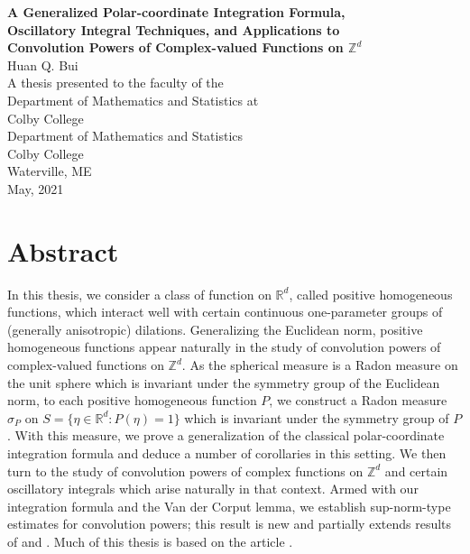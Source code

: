 \documentclass[11pt, letter]{book}
\begin{document}
\thispagestyle{empty}
\begin{center}
{\Large{\textbf{
A Generalized Polar-coordinate Integration Formula, \\
Oscillatory Integral Techniques, and Applications to \\Convolution Powers of Complex-valued Functions on $\mathbb{Z}^d$ 
}}}\\
\vspace{1cm}
{\large{Huan Q. Bui}}\\
\vspace{7cm}
A thesis presented to the faculty of the\\
Department of Mathematics and Statistics at\\
Colby College\\
\vspace{7cm}
Department of Mathematics and Statistics\\
Colby College\\
Waterville, ME\\
May, 2021
\end{center}


\newpage
\section*{Abstract} 


In this thesis, we consider a class of function on $\mathbb{R}^d$, called positive homogeneous functions, which interact well with certain continuous one-parameter groups of (generally anisotropic) dilations. Generalizing the Euclidean norm, positive homogeneous functions appear naturally in the study of convolution powers of complex-valued functions on $\mathbb{Z}^d$. As the spherical measure is a Radon measure on the unit sphere which is invariant under the symmetry group of the Euclidean norm, to each positive homogeneous function $P$, we construct a Radon measure $\sigma_P$ on $S=\{\eta \in \mathbb{R}^d:P(\eta)=1\}$ which is invariant under the symmetry group of $P$. With this measure, we prove a generalization of the classical polar-coordinate integration formula and deduce a number of corollaries in this setting. We then turn to the study of convolution powers of complex functions on $\mathbb{Z}^d$ and certain oscillatory integrals which arise naturally in that context. Armed with our integration formula and the Van der Corput lemma, we establish sup-norm-type estimates for convolution powers; this result is new and partially extends results of \cite{randles_convolution_2015} and \cite{randles_convolution_2017}. Much of this thesis is based on the article \cite{bui2021generalized}.
\end{document}
